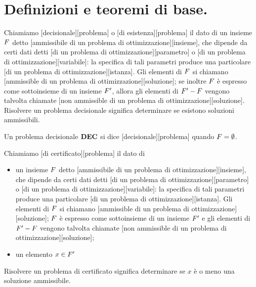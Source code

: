 \section{Definizioni e teoremi di base.}\label{DefinizioniETeoremiDiBase}
\begin{Definition}
	Chiamiamo
	[decisionale][problema] o
	[di esistenza][problema]
	il dato di un insieme $F$ detto
  [ammissibile di un problema di ottimizzazione][insieme],
  che dipende da certi dati detti
  [di un problema di ottimizzazione][parametro] o
  [di un problema di ottimizzazione][variabile]:
  la specifica di tali parametri produce una particolare
  [di un problema di ottimizzazione][istanza].
  Gli elementi di $F$ si chiamano
  [ammissible di un problema di ottimizzazione][soluzione];
  se inoltre $F$ \`e espresso come sottoinsieme
  di un insieme $F'$, allora gli elementi di
  $F' - F$ vengono talvolta chiamate
  [non ammissible di un problema di ottimizzazione][soluzione].
  Risolvere un problema decisionale significa determinare se esistono soluzioni ammissibili.
\end{Definition}
\begin{Definition}
	Un problema decisionale $\textbf{DEC}$ si dice [decisionale][problema] quando $F = \emptyset$.
\end{Definition}
\begin{Definition}
	Chiamiamo
	[di certificato][problema]
	il dato di
	\begin{itemize}
		\item un insieme $F$ detto
		[ammissibile di un problema di ottimizzazione][insieme],
		che dipende da certi dati detti
		[di un problema di ottimizzazione][parametro] o
		[di un problema di ottimizzazione][variabile]:
		la specifica di tali parametri produce una particolare
		[di un problema di ottimizzazione][istanza].
		Gli elementi di $F$ si chiamano
		[ammissible di un problema di ottimizzazione][soluzione];
		$F$ \`e espresso come sottoinsieme
		di un insieme $F'$ e gli elementi di
		$F' - F$ vengono talvolta chiamate
		[non ammissible di un problema di ottimizzazione][soluzione];
		\item un elemento $x \in F'$
	\end{itemize}
	Risolvere un problema di certificato significa determinare se $x$ \`e o meno una soluzione ammissibile.
\end{Definition}
